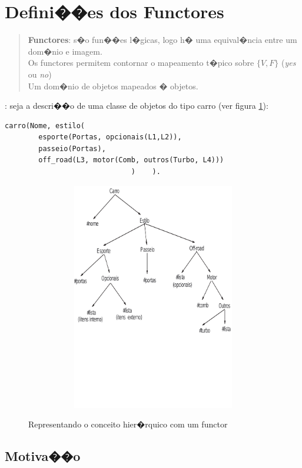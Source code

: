 \documentclass[final,a4paper]{article}
\begin{document}
\section{Defini��es dos Functores}

\begin{quotation}
{\bf Functores}:  s�o fun��es l�gicas, logo  h� uma
equival�ncia entre um dom�nio e imagem.\\

 Os functores permitem contornar o
    mapeamento t�pico sobre $\{V,F\}$ ({\em yes}
ou {\em no})\\

 Um dom�nio de objetos mapeados � objetos.
\end{quotation}


: seja a descri��o de uma classe
de objetos do tipo carro (ver figura
\ref{functor}):
{\small
\begin{verbatim}
carro(Nome, estilo(
        esporte(Portas, opcionais(L1,L2)),
        passeio(Portas),
        off_road(L3, motor(Comb, outros(Turbo, L4)))
                              )    ).
\end{verbatim}
}

\begin{figure}[!htb]
\centering
\includegraphics[height=10cm, width=12cm]{figuras/functor.pdf}
\label{functor}
\caption{Representando o conceito hier�rquico com um functor}
\end{figure}



\subsection{Motiva��o}
\end{document}
